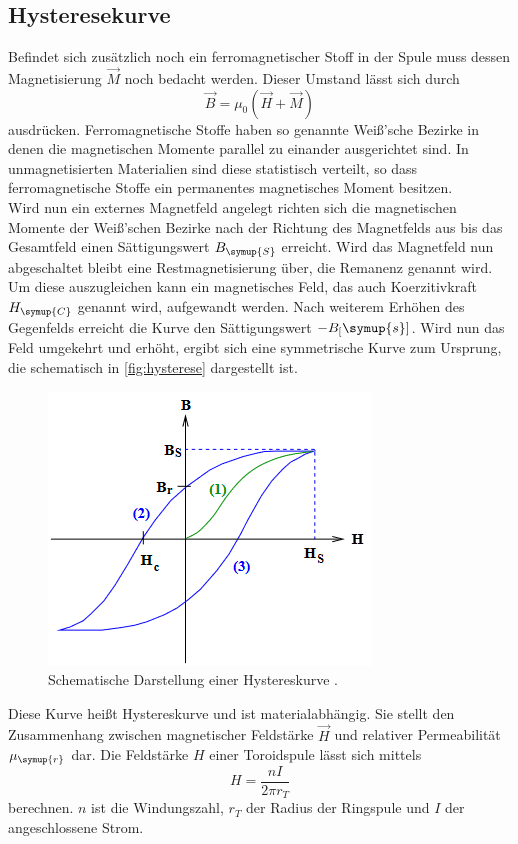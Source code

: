 \subsection{Hysteresekurve}
\label{sec:hysterese}
Befindet sich zusätzlich noch ein ferromagnetischer Stoff in der Spule muss dessen Magnetisierung $\vec{M}$
noch bedacht werden. Dieser Umstand lässt sich durch
\begin{equation}
    \vec{B} = \mu_0 (\vec{H} + \vec{M})
\end{equation}
ausdrücken. Ferromagnetische Stoffe haben so genannte Weiß'sche Bezirke in denen die magnetischen
Momente parallel zu einander ausgerichtet sind. In unmagnetisierten Materialien sind diese statistisch verteilt,
so dass ferromagnetische Stoffe ein permanentes magnetisches Moment besitzen.\\
Wird nun ein externes Magnetfeld angelegt richten sich die magnetischen Momente der Weiß'schen Bezirke
nach der Richtung des Magnetfelds aus bis das Gesamtfeld einen Sättigungswert
$B_{\symup{S}}$ erreicht. Wird das Magnetfeld nun abgeschaltet bleibt eine Restmagnetisierung
über, die Remanenz genannt wird. Um diese auszugleichen kann ein magnetisches Feld, das
auch Koerzitivkraft $H_{\symup{C}}$ genannt wird, aufgewandt werden. Nach weiterem Erhöhen des Gegenfelds
erreicht die Kurve den Sättigungswert $-B_[\symup{s}]$. Wird nun das Feld umgekehrt und erhöht, ergibt sich eine
symmetrische Kurve zum Ursprung, die schematisch in \autoref{fig:hysterese} dargestellt ist.
\begin{figure}[h]
    \centering
    \includegraphics[scale=0.5]{hysterese.png}
    \caption{Schematische Darstellung einer Hystereskurve \cite{sample}.}
    \label{fig:hysterese}
\end{figure}
Diese Kurve heißt Hystereskurve und ist materialabhängig. Sie stellt den Zusammenhang zwischen magnetischer Feldstärke
$\vec{H}$ und relativer Permeabilität $\mu_{\symup{r}}$ dar.
Die Feldstärke $H$ einer Toroidspule lässt sich mittels 
\begin{equation}
    \label{eqn:H}
    H = \frac{nI}{2 \pi r_T}
\end{equation}
berechnen. $n$ ist die Windungszahl, $r_T$ der Radius der Ringspule und $I$ der angeschlossene Strom.